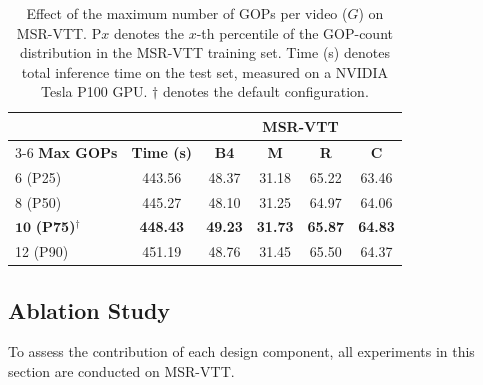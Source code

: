 \begin{table}[!t]
\caption{Effect of the maximum number of GOPs per video ($G$) on MSR-VTT. P$x$ denotes the $x$-th percentile of the GOP-count distribution in the MSR-VTT training set. Time (s) denotes total inference time on the test set, measured on a NVIDIA Tesla P100 GPU. $\dagger$ denotes the default configuration.}
\label{tab:exp_max_gops}
\centering
\begin{tabular}{l c cccc}
\hline\hline
 & & \multicolumn{4}{c}{\textbf{MSR-VTT}} \\
\cline{3-6}
\textbf{Max GOPs} & \textbf{Time (s)} & \textbf{B4} & \textbf{M} & \textbf{R} & \textbf{C} \\
\hline
6 (P25) & 443.56 & 48.37 & 31.18 & 65.22 & 63.46 \\
8 (P50) & 445.27 & 48.10 & 31.25 & 64.97 & 64.06 \\
$\mathbf{10}$ \textbf{(P75)}$^\dagger$ & \textbf{448.43} & \textbf{49.23} & \textbf{31.73} & \textbf{65.87} & \textbf{64.83} \\
12 (P90) & 451.19 & 48.76 & 31.45 & 65.50 & 64.37 \\
\hline\hline
\end{tabular}
\end{table}





\subsection{Ablation Study}
\label{subsec:subsec_56_ablation}
To assess the contribution of each design component, all experiments in this section are conducted on MSR-VTT.

